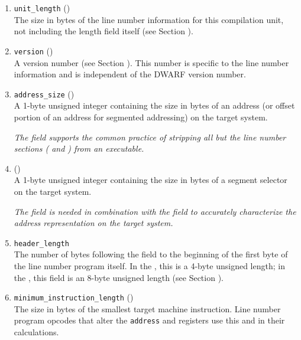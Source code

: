 \begin{enumerate}[1. ]
\item \texttt{unit\_length} ()  \\
The size in bytes of the line number information for this
compilation unit, not including the length field itself
(see Section ). 

\item \texttt{version} (\HFTuhalf) \\
A version number 
(see Section ). 
This number is specific to
the line number information and is independent of the DWARF
version number. 

\item \texttt{address\_size} (\HFTubyte)\\
A 1-byte unsigned integer containing the size in bytes of an
address (or offset portion of an address for segmented addressing)
on the target system.

\textit{The  field 
\bb
supports 
\eb
the common practice of stripping all but 
the line number sections (\dotdebugline{} and \dotdebuglinestr{}) 
from an executable.}

\item \HFNsegmentselectorsize{} (\HFTubyte) \\
A 1-byte unsigned integer containing the size in bytes of a segment
selector on the target system.
   
\textit{The \HFNsegmentselectorsize{} field 
\db
is needed in combination with the  field 
to accurately characterize the address representation on the target 
system.}

\item \texttt{header\_length}  \\
The number of bytes following the  field to the
beginning of the first byte of the line number program itself.
In the \thirtytwobitdwarfformat, this is a 4-byte unsigned
length; in the \sixtyfourbitdwarfformat, this field is an
8-byte unsigned length 
(see Section ). 

\item \texttt{minimum\_instruction\_length} (\HFTubyte)  \\
The size in bytes of the smallest target machine
instruction. Line number program opcodes that alter
the \texttt{address} and 
registers use this and
in their calculations. 


\end{enumerate}
